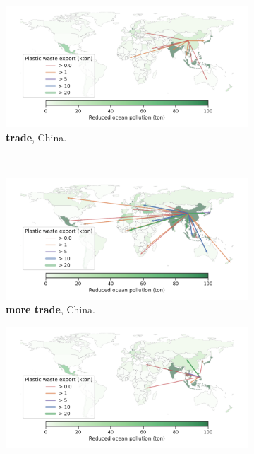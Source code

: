 \documentclass[dvipsnames]{article}
\begin{document}
\begin{figure}
\centering
\begin{subfigure}{0.47\textwidth}
    \centering
    \includegraphics[width=\textwidth]{figures/china_trade_export_w1.pdf}
    \caption{\textbf{trade}, China.}
\end{subfigure}
~
\begin{subfigure}{0.47\textwidth}
    \centering
    \includegraphics[width=\textwidth]{figures/china_trade_export_w10.pdf}
    \caption{\textbf{more trade}, China.}
\end{subfigure}
\begin{subfigure}{0.47\textwidth}
    \centering
    \includegraphics[width=\textwidth]{figures/phl_trade_export_w1.pdf}

\end{subfigure}
\end{figure}
\end{document}
